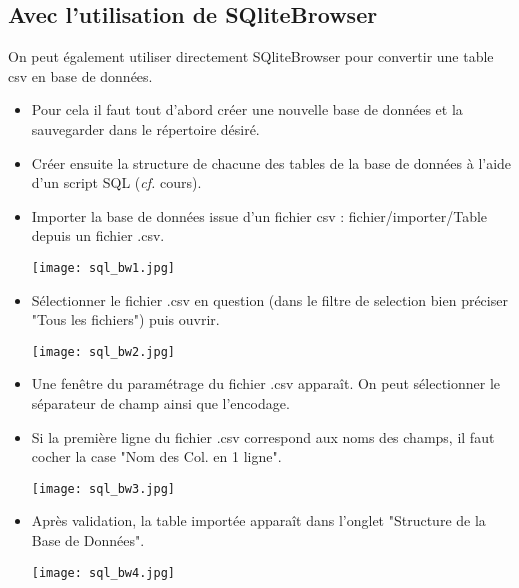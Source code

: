 \subsection{Avec l'utilisation de SQliteBrowser}
On peut également utiliser directement SQliteBrowser pour convertir une table csv en base de données. 
\begin{itemize}
\item Pour cela il faut tout d'abord créer une nouvelle base de données et la sauvegarder dans le répertoire désiré.
\item Créer ensuite la structure de chacune des tables de la base de données à l'aide d'un script SQL (\emph{cf.} cours). 
\item Importer la base de données issue d'un fichier csv : fichier/importer/Table depuis un fichier .csv.
\begin{center}
\texttt{[image: sql\_bw1.jpg]}
\end{center}
\item Sélectionner le fichier .csv en question (dans le filtre de selection bien préciser "Tous les fichiers") puis ouvrir.
\begin{center}
\texttt{[image: sql\_bw2.jpg]}
\end{center}
\item Une fenêtre du paramétrage du fichier .csv apparaît. On peut sélectionner le séparateur de champ ainsi que l'encodage. 
\item Si la première ligne du fichier .csv correspond aux noms des champs, il faut cocher la case "Nom des Col. en 1 ligne".
\begin{center}
\texttt{[image: sql\_bw3.jpg]}
\end{center}
\item Après validation, la table importée apparaît dans l'onglet "Structure de la Base de Données".
\begin{center}
\texttt{[image: sql\_bw4.jpg]}
\end{center}
\end{itemize}